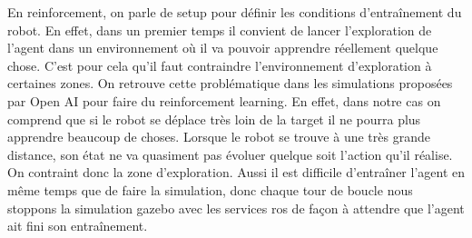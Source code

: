 En reinforcement, on parle de setup pour définir les conditions d’entraînement du robot. En effet, dans un premier temps il convient de lancer l'exploration de l’agent dans un environnement où il va pouvoir apprendre réellement quelque chose.
C’est pour cela qu’il faut contraindre l’environnement d’exploration à certaines zones.
On retrouve cette problématique dans les simulations proposées par Open AI pour faire du reinforcement learning.
En effet, dans notre cas on comprend que si le robot se déplace très loin de la target il ne pourra plus apprendre beaucoup de choses. Lorsque le robot se trouve à une très grande distance, son état ne va quasiment pas évoluer quelque soit l’action qu’il réalise.
On contraint donc la zone d’exploration.
Aussi il est difficile d’entraîner l’agent en même temps que de faire la simulation, donc chaque tour de boucle nous stoppons la simulation gazebo avec les services ros de façon à attendre que l’agent ait fini son entraînement.
